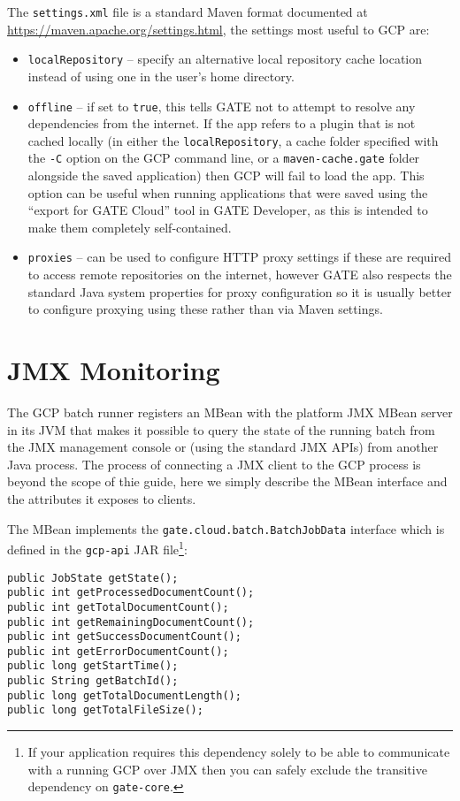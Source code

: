 The \verb!settings.xml! file is a standard Maven format documented at
\url{https://maven.apache.org/settings.html}, the settings most useful to GCP
are:
\begin{itemize}
\item \verb!localRepository! -- specify an alternative local repository cache
  location instead of using one in the user's home directory.
\item \verb!offline! -- if set to \verb!true!, this tells GATE not to attempt
  to resolve any dependencies from the internet.  If the app refers to a plugin
  that is not cached locally (in either the \verb!localRepository!, a cache
  folder specified with the \verb!-C! option on the GCP command line, or a
  \verb!maven-cache.gate!  folder alongside the saved application) then GCP
  will fail to load the app.  This option can be useful when running
  applications that were saved using the ``export for GATE Cloud'' tool in GATE
  Developer, as this is intended to make them completely self-contained.
\item \verb!proxies! -- can be used to configure HTTP proxy settings if these
  are required to access remote repositories on the internet, however GATE also
  respects the standard Java system properties for proxy configuration so it is
  usually better to configure proxying using these rather than via Maven
  settings.
\end{itemize}

\section{JMX Monitoring}

The GCP batch runner registers an MBean with the platform JMX MBean server in
its JVM that makes it possible to query the state of the running batch from the
JMX management console or (using the standard JMX APIs) from another Java
process.  The process of connecting a JMX client to the GCP process is beyond
the scope of thie guide, here we simply describe the MBean interface and the
attributes it exposes to clients.

The MBean implements the \verb!gate.cloud.batch.BatchJobData! interface which
is defined in the \verb!gcp-api! JAR file\footnote{If your application requires
this dependency solely to be able to communicate with a running GCP over JMX then
you can safely exclude the transitive dependency on \texttt{gate-core}.}:

\begin{lstlisting}[breaklines]
public JobState getState();
public int getProcessedDocumentCount();
public int getTotalDocumentCount();
public int getRemainingDocumentCount();
public int getSuccessDocumentCount();
public int getErrorDocumentCount();
public long getStartTime();
public String getBatchId();
public long getTotalDocumentLength();
public long getTotalFileSize();
\end{lstlisting}

